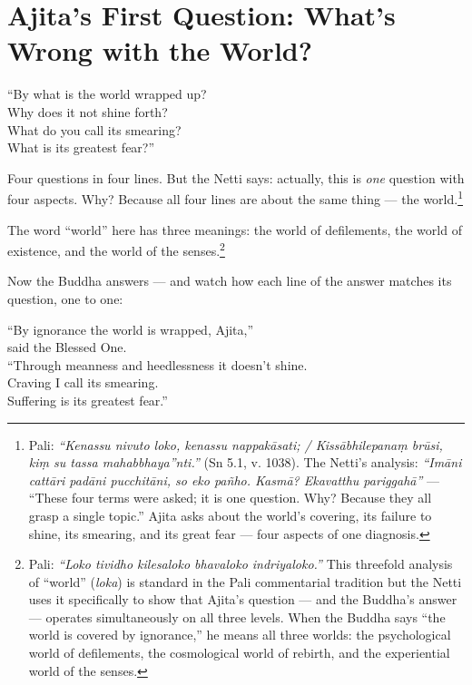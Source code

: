 \section*{Ajita's First Question: What's Wrong with the World?}

\begin{versebox}
``By what is the world wrapped up?\\
Why does it not shine forth?\\
What do you call its smearing?\\
What is its greatest fear?''
\end{versebox}

Four questions in four lines. But the Netti says: actually, this is \textit{one} question with four aspects. Why? Because all four lines are about the same thing --- the world.\footnote{Pali: \textit{``Kenassu nivuto loko, kenassu nappakāsati; / Kissābhilepanaṃ brūsi, kiṃ su tassa mahabbhaya''nti.''} (Sn 5.1, v. 1038). The Netti's analysis: \textit{``Imāni cattāri padāni pucchitāni, so eko pañho. Kasmā? Ekavatthu pariggahā''} --- ``These four terms were asked; it is one question. Why? Because they all grasp a single topic.'' Ajita asks about the world's covering, its failure to shine, its smearing, and its great fear --- four aspects of one diagnosis.}

The word ``world'' here has three meanings: the world of defilements, the world of existence, and the world of the senses.\footnote{Pali: \textit{``Loko tividho kilesaloko bhavaloko indriyaloko.''} This threefold analysis of ``world'' (\textit{loka}) is standard in the Pali commentarial tradition but the Netti uses it specifically to show that Ajita's question --- and the Buddha's answer --- operates simultaneously on all three levels. When the Buddha says ``the world is covered by ignorance,'' he means all three worlds: the psychological world of defilements, the cosmological world of rebirth, and the experiential world of the senses.}

Now the Buddha answers --- and watch how each line of the answer matches its question, one to one:

\begin{versebox}
``By ignorance the world is wrapped, Ajita,''\\
said the Blessed One.\\
``Through meanness and heedlessness it doesn't shine.\\
Craving I call its smearing.\\
Suffering is its greatest fear.''
\end{versebox}

